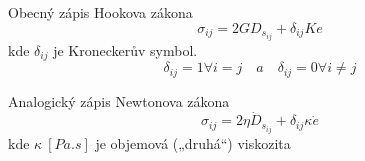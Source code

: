 Obecný zápis Hookova zákona
\begin{equation}
\sigma_{ij} = 2 G D_{s_{ij}} + \delta_{ij} K e
\end{equation}
kde $\delta_{ij}$ je Kroneckerův symbol.
\begin{equation}
\delta_{ij} = 1 \forall i = j \quad a \quad \delta_{ij} = 0 \forall i \neq j
\end{equation}

Analogický zápis Newtonova zákona
\begin{equation}
\sigma_{ij} = 2 \eta \dot{D}_{s_{ij}} + \delta_{ij} \kappa \dot{e}
\end{equation}
kde $\kappa\:[Pa.s]$ je objemová („druhá“) viskozita